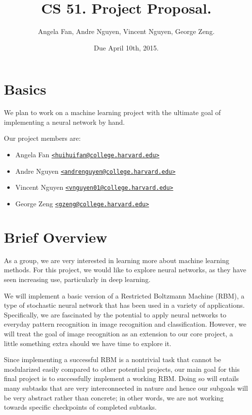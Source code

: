 \documentclass[12pt]{article}
\begin{document}
\title{CS 51. Project Proposal.}
\date{Due April 10th, 2015.}
\author{Angela Fan, Andre Nguyen, Vincent Nguyen, George Zeng.}
\maketitle

\section{Basics}
We plan to work on a machine learning project with the ultimate goal of implementing a neural network by hand.

Our project members are:
\begin{itemize}
  \item Angela Fan \href{mailto:huihuifan@college.harvard.edu}
    {\nolinkurl{<huihuifan@college.harvard.edu>}}
  \item Andre Nguyen \href{mailto:andrenguyen@college.harvard.edu}
    {\nolinkurl{<andrenguyen@college.harvard.edu>}}
  \item Vincent Nguyen \href{mailto:vnguyen01@college.harvard.edu}
    {\nolinkurl{<vnguyen01@college.harvard.edu>}}
  \item George Zeng \href{mailto:gzeng@college.harvard.edu}
    {\nolinkurl{<gzeng@college.harvard.edu>}}
\end{itemize}

\section{Brief Overview}
As a group, we are very interested in learning more about machine learning methods. For this project, we would like to explore neural networks, as they have seen increasing use, particularly in deep learning.

We will implement a basic version of a Restricted Boltzmann Machine (RBM), a type of stochastic neural network that has been used in a variety of applications. Specifically, we are fascinated by the potential to apply neural networks to everyday pattern recognition in image recognition and classification. However, we will treat the goal of image recognition as an extension to our core project, a little something extra should we have time to explore it. 

Since implementing a successful RBM is a nontrivial task that cannot be modularized easily compared to other potential projects, our main goal for this final project is to successfully implement a working RBM. Doing so will entails many subtasks that are very interconnected in nature and hence our subgoals will be very abstract rather than concrete; in other words, we are not working towards specific checkpoints of completed subtasks. 
\end{document}
